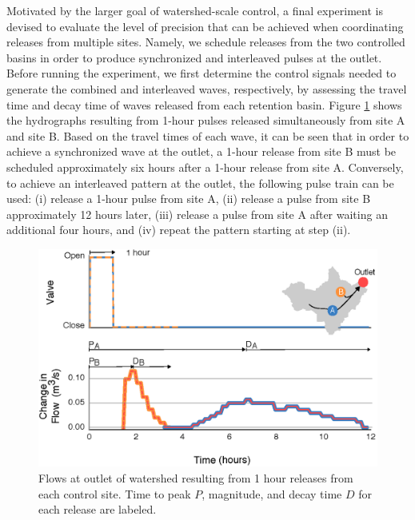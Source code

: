 Motivated by the larger goal of watershed-scale control, a final experiment is devised to evaluate the level of precision that can be achieved when coordinating releases from multiple sites. Namely, we schedule releases from the two controlled basins in order to produce synchronized and interleaved pulses at the outlet. Before running the experiment, we first determine the control signals needed to generate the combined and interleaved waves, respectively, by assessing the travel time and decay time of waves released from each retention basin. Figure \ref{fig:6} shows the hydrographs resulting from 1-hour pulses released simultaneously from site A and site B. Based on the travel times of each wave, it can be seen that in order to achieve a synchronized wave at the outlet, a 1-hour release from site B must be scheduled approximately six hours after a 1-hour release from site A. Conversely, to achieve an interleaved pattern at the outlet, the following pulse train can be used: (i) release a 1-hour pulse from site A, (ii) release a pulse from site B approximately 12 hours later, (iii) release a pulse from site A after waiting an additional four hours, and (iv) repeat the pattern starting at step (ii).

\begin{figure}[H]
    \centering
    \includegraphics[width=\textwidth]{gfx/Chapter-2/Figure4.eps}
    \caption{Flows at outlet of watershed resulting from 1 hour releases from each control site. Time to peak $P$, magnitude, and decay time $D$ for each release are labeled. }
    \label{fig:6}
\end{figure}


